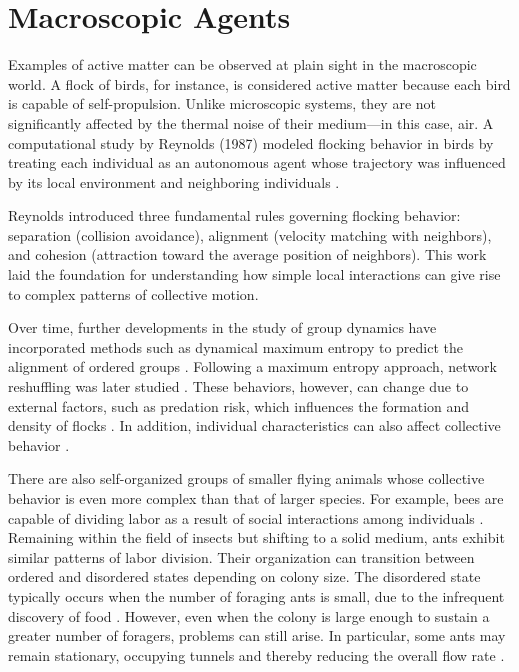 \section{Macroscopic Agents}

Examples of active matter can be observed at plain sight in the macroscopic world. A flock of birds, for instance, is considered active matter because each bird is capable of self-propulsion. Unlike microscopic systems, they are not significantly affected by the thermal noise of their medium—in this case, air. A computational study by Reynolds (1987) modeled flocking behavior in birds by treating each individual as an autonomous agent whose trajectory was influenced by its local environment and neighboring individuals \cite{reynolds1987flocks}.

Reynolds introduced three fundamental rules governing flocking behavior: separation (collision avoidance), alignment (velocity matching with neighbors), and cohesion (attraction toward the average position of neighbors). This work laid the foundation for understanding how simple local interactions can give rise to complex patterns of collective motion. 

Over time, further developments in the study of group dynamics have incorporated methods such as dynamical maximum entropy to predict the alignment of ordered groups \cite{cavagna2014dynamical}. Following a maximum entropy approach, network reshuffling was later studied \cite{mora1511questioning}. These behaviors, however, can change due to external factors, such as predation risk, which influences the formation and density of flocks \cite{carere2009aerial}. In addition, individual characteristics can also affect collective behavior \cite{couzin2002collective}.


There are also self-organized groups of smaller flying animals whose collective behavior is even more complex than that of larger species. For example, bees are capable of dividing labor as a result of social interactions among individuals \cite{jeanson2005emergence}. Remaining within the field of insects but shifting to a solid medium, ants exhibit similar patterns of labor division. Their organization can transition between ordered and disordered states depending on colony size. The disordered state typically occurs when the number of foraging ants is small, due to the infrequent discovery of food \cite{beekman2001phase}. However, even when the colony is large enough to sustain a greater number of foragers, problems can still arise. In particular, some ants may remain stationary, occupying tunnels and thereby reducing the overall flow rate \cite{aguilar2018collective}.

